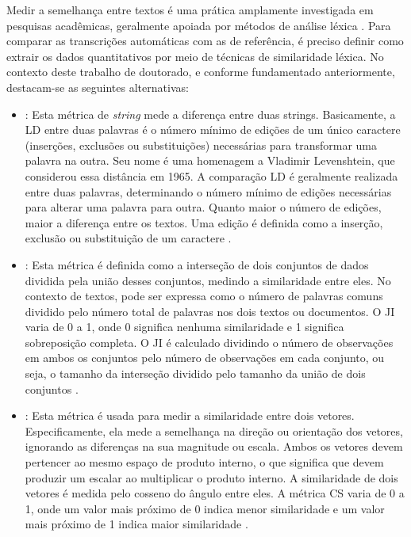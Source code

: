 Medir a semelhança entre textos é uma prática amplamente investigada em pesquisas acadêmicas, geralmente apoiada por métodos de análise léxica \cite{Majumdar2022}. Para comparar as transcrições automáticas com as de referência, é preciso definir como extrair os dados quantitativos por meio de técnicas de similaridade léxica. No contexto deste trabalho de doutorado, e conforme fundamentado anteriormente, destacam-se as seguintes alternativas:

\begin{itemize}

\item \textbf{}: Esta métrica de \textit{string} mede a diferença entre duas strings. Basicamente, a LD entre duas palavras é o número mínimo de edições de um único caractere (inserções, exclusões ou substituições) necessárias para transformar uma palavra na outra. Seu nome é uma homenagem a Vladimir Levenshtein, que considerou essa distância em 1965. A comparação LD é geralmente realizada entre duas palavras, determinando o número mínimo de edições necessárias para alterar uma palavra para outra. Quanto maior o número de edições, maior a diferença entre os textos. Uma edição é definida como a inserção, exclusão ou substituição de um caractere \cite{levens-1,levens-2}.

\item \textbf{}: Esta métrica é definida como a interseção de dois conjuntos de dados dividida pela união desses conjuntos, medindo a similaridade entre eles. No contexto de textos, pode ser expressa como o número de palavras comuns dividido pelo número total de palavras nos dois textos ou documentos. O JI varia de 0 a 1, onde 0 significa nenhuma similaridade e 1 significa sobreposição completa. O JI é calculado dividindo o número de observações em ambos os conjuntos pelo número de observações em cada conjunto, ou seja, o tamanho da interseção dividido pelo tamanho da união de dois conjuntos \cite{jaccard-1,jaccard-2}.

\item \textbf{}: Esta métrica é usada para medir a similaridade entre dois vetores. Especificamente, ela mede a semelhança na direção ou orientação dos vetores, ignorando as diferenças na sua magnitude ou escala. Ambos os vetores devem pertencer ao mesmo espaço de produto interno, o que significa que devem produzir um escalar ao multiplicar o produto interno. A similaridade de dois vetores é medida pelo cosseno do ângulo entre eles. A métrica CS varia de 0 a 1, onde um valor mais próximo de 0 indica menor similaridade e um valor mais próximo de 1 indica maior similaridade \cite{cosseno-1,cosseno-2,cosseno-3}.

\end{itemize}

